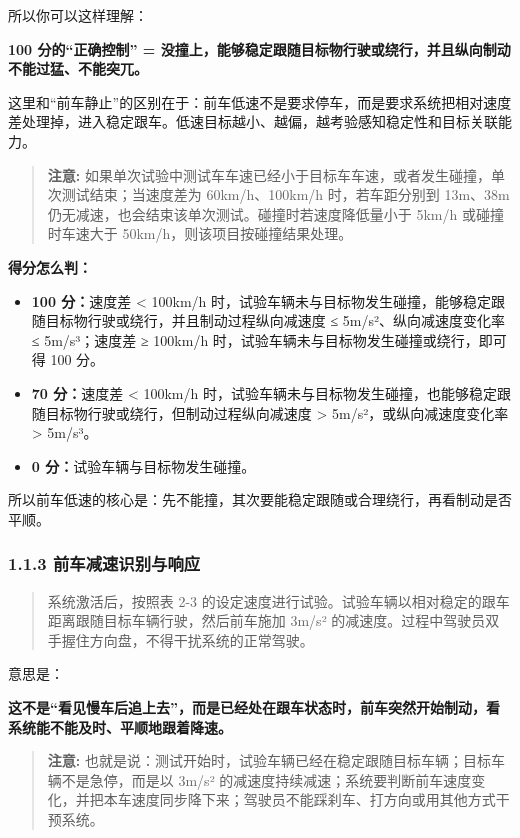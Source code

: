 所以你可以这样理解：

\textbf{100 分的“正确控制” = 没撞上，能够稳定跟随目标物行驶或绕行，并且纵向制动不能过猛、不能突兀。}

这里和“前车静止”的区别在于：前车低速不是要求停车，而是要求系统把相对速度差处理掉，进入稳定跟车。低速目标越小、越偏，越考验感知稳定性和目标关联能力。

\begin{quote}
  \textbf{注意:} 如果单次试验中测试车车速已经小于目标车车速，或者发生碰撞，单次测试结束；当速度差为 60km/h、100km/h 时，若车距分别到 13m、38m 仍无减速，也会结束该单次测试。碰撞时若速度降低量小于 5km/h 或碰撞时车速大于 50km/h，则该项目按碰撞结果处理。
\end{quote}

\textbf{得分怎么判：}

\begin{itemize}
  \item \textbf{100 分：}速度差 < 100km/h 时，试验车辆未与目标物发生碰撞，能够稳定跟随目标物行驶或绕行，并且制动过程纵向减速度 ≤ 5m/s²、纵向减速度变化率 ≤ 5m/s³；速度差 ≥ 100km/h 时，试验车辆未与目标物发生碰撞或绕行，即可得 100 分。
  \item \textbf{70 分：}速度差 < 100km/h 时，试验车辆未与目标物发生碰撞，也能够稳定跟随目标物行驶或绕行，但制动过程纵向减速度 > 5m/s²，或纵向减速度变化率 > 5m/s³。
  \item \textbf{0 分：}试验车辆与目标物发生碰撞。
\end{itemize}

所以前车低速的核心是：先不能撞，其次要能稳定跟随或合理绕行，再看制动是否平顺。

\subsubsection{1.1.3 前车减速识别与响应}

\begin{quote}
  系统激活后，按照表 2-3 的设定速度进行试验。试验车辆以相对稳定的跟车距离跟随目标车辆行驶，然后前车施加 3m/s² 的减速度。过程中驾驶员双手握住方向盘，不得干扰系统的正常驾驶。
\end{quote}

意思是：

\textbf{这不是“看见慢车后追上去”，而是已经处在跟车状态时，前车突然开始制动，看系统能不能及时、平顺地跟着降速。}

\begin{quote}
  \textbf{注意:} 也就是说：测试开始时，试验车辆已经在稳定跟随目标车辆；目标车辆不是急停，而是以 3m/s² 的减速度持续减速；系统要判断前车速度变化，并把本车速度同步降下来；驾驶员不能踩刹车、打方向或用其他方式干预系统。
\end{quote}

